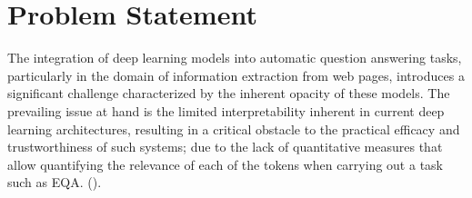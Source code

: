 \section{Problem Statement}
\label{sec:problem}  


The integration of deep learning models into automatic question answering tasks, particularly in the domain of information extraction from web pages, introduces a significant challenge characterized by the inherent opacity of these models. The prevailing issue at hand is the limited interpretability inherent in current deep learning architectures, resulting in a critical obstacle to the practical efficacy and trustworthiness of such systems; due to the lack of quantitative measures that allow quantifying the relevance of each of the tokens when carrying out a task such as EQA. (\cite{yusuf2022analysis}). 

